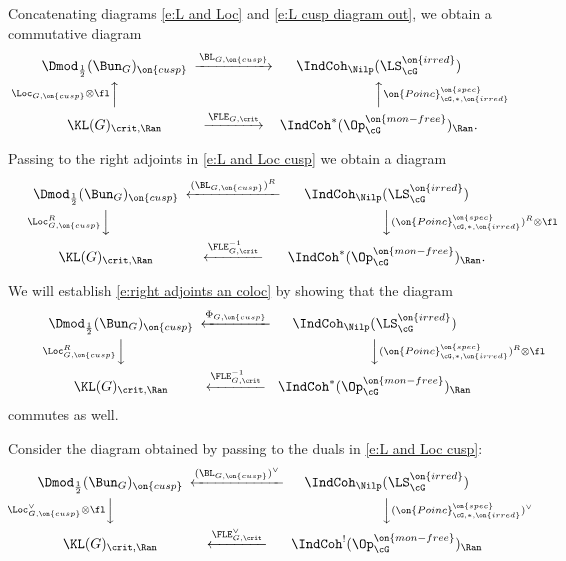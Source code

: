 \documentclass[9pt]{amsart}
\theoremstyle{remark}
\theoremstyle{definition}
\theoremstyle{remark}
\numberwithin{equation}{section}
\begin{document}
\sssec{}

Concatenating diagrams \eqref{e:L and Loc} and \eqref{e:L cusp diagram out}, we obtain a commutative diagram
\begin{equation} \label{e:L and Loc cusp}
\CD
\Dmod_{\frac{1}{2}}(\Bun_G)_{\on{cusp}} @>{\BL_{G,\on{cusp}}}>> \IndCoh_\Nilp(\LS^{\on{irred}}_\cG) \\
@A{\Loc_{G,\on{cusp}}\otimes \fl}AA @AA{\on{Poinc}^{\on{spec}}_{\cG,*,\on{irred}}}A \\
\KL(G)_{\crit,\Ran} @>{\FLE_{G,\crit}}>> \IndCoh^*(\Op^{\on{mon-free}}_\cG)_\Ran.
\endCD
\end{equation}

\medskip

Passing to the right adjoints in \eqref{e:L and Loc cusp} we obtain a diagram
\begin{equation} \label{e:L and Loc cusp right adj}
\CD
\Dmod_{\frac{1}{2}}(\Bun_G)_{\on{cusp}} @<{(\BL_{G,\on{cusp}})^R}<< \IndCoh_\Nilp(\LS^{\on{irred}}_\cG) \\
@V{\Loc^R_{G,\on{cusp}}}VV @VV{(\on{Poinc}^{\on{spec}}_{\cG,*,\on{irred}})^R\otimes \fl}V \\
\KL(G)_{\crit,\Ran} @<{\FLE_{G,\crit}^{-1}}<< \IndCoh^*(\Op^{\on{mon-free}}_\cG)_\Ran.
\endCD
\end{equation}

We will establish \eqref{e:right adjoints an coloc} by showing that the diagram 
\begin{equation} \label{e:L and Loc cusp dual}
\CD
\Dmod_{\frac{1}{2}}(\Bun_G)_{\on{cusp}} @<{\Phi_{G,\on{cusp}}}<< \IndCoh_\Nilp(\LS^{\on{irred}}_\cG) \\
@V{\Loc^R_{G,\on{cusp}}}VV @VV{(\on{Poinc}^{\on{spec}}_{\cG,*,\on{irred}})^R\otimes \fl}V \\
\KL(G)_{\crit,\Ran} @<{\FLE_{G,\crit}^{-1}}<< \IndCoh^*(\Op^{\on{mon-free}}_\cG)_\Ran
\endCD
\end{equation}
commutes as well.

\sssec{}

Consider the diagram obtained by passing to the duals in \eqref{e:L and Loc cusp}:
\begin{equation} \label{e:L and Loc cusp dual 0}
\CD
\Dmod_{\frac{1}{2}}(\Bun_G)_{\on{cusp}} @<{(\BL_{G,\on{cusp}})^\vee}<< \IndCoh_\Nilp(\LS^{\on{irred}}_\cG) \\
@V{\Loc_{G,\on{cusp}}^\vee\otimes \fl}VV @VV{(\on{Poinc}^{\on{spec}}_{\cG,*,\on{irred}})^\vee}V \\
\KL(G)_{\crit,\Ran} @<{\FLE_{G,\crit}^\vee}<< \IndCoh^!(\Op^{\on{mon-free}}_\cG)_\Ran
\endCD
\end{equation}
\end{document}
